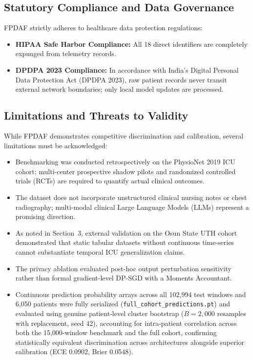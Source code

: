 \documentclass[final,5p,times,twocolumn]{elsarticle}
\begin{document}
\subsection{Statutory Compliance and Data Governance}
FPDAF strictly adheres to healthcare data protection regulations:
\begin{itemize}
    \item \textbf{HIPAA Safe Harbor Compliance:} All 18 direct identifiers are completely expunged from telemetry records.
    \item \textbf{DPDPA 2023 Compliance:} In accordance with India's Digital Personal Data Protection Act (DPDPA 2023), raw patient records never transit external network boundaries; only local model updates are processed.
\end{itemize}

\subsection{Limitations and Threats to Validity}
While FPDAF demonstrates competitive discrimination and calibration, several limitations must be acknowledged:
\begin{itemize}
    \item Benchmarking was conducted retrospectively on the PhysioNet 2019 ICU cohort; multi-center prospective shadow pilots and randomized controlled trials (RCTs) are required to quantify actual clinical outcomes.
    \item The dataset does not incorporate unstructured clinical nursing notes or chest radiography; multi-modal clinical Large Language Models (LLMs) represent a promising direction.
    \item As noted in Section~3, external validation on the Osun State UTH cohort demonstrated that static tabular datasets without continuous time-series cannot substantiate temporal ICU generalization claims.
    \item The privacy ablation evaluated post-hoc output perturbation sensitivity rather than formal gradient-level DP-SGD with a Moments Accountant.
    \item Continuous prediction probability arrays across all 102,994 test windows and 6,050 patients were fully serialized (\texttt{full\_cohort\_predictions.pt}) and evaluated using genuine patient-level cluster bootstrap ($B=2,000$ resamples with replacement, seed 42), accounting for intra-patient correlation across both the 15,000-window benchmark and the full cohort, confirming statistically equivalent discrimination across architectures alongside superior calibration (ECE 0.0902, Brier 0.0548).
\end{itemize}
\end{document}
